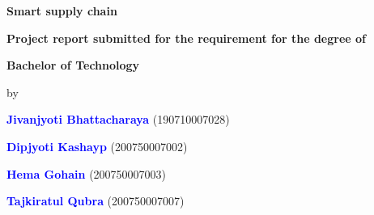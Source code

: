 
\thispagestyle{empty}
\singlespacing
\begin{titlepage}
\begin{center}
    \centering
     
      
  {{\Large \textbf{Smart supply chain}\par}}
    \vspace{1cm}%
     
    \vspace{0.4cm}
    {
    \textbf{\large Project report submitted for the requirement for the degree of } \par}
    \vspace{0.2cm}


\vspace{0.5cm}
    {
    \textbf{\large Bachelor of Technology \\ \vspace{1mm} } \par}
    \vspace{2mm}


    

\vspace{5mm}
    {\large by\par}
    \vspace{0.05cm}
    {\large \textbf{\textcolor{blue}{Jivanjyoti Bhattacharaya}}  (190710007028)\par} 
    {\large \textbf{\textcolor{blue}{Dipjyoti Kashayp}}  (200750007002)\par} 
    {\large \textbf{\textcolor{blue}{Hema Gohain}}  (200750007003)\par} 
    {\large \textbf{\textcolor{blue}{Tajkiratul Qubra}}  (200750007007)\par} 
    \vspace{0.4cm}
    

\end{center}
\end{titlepage}
